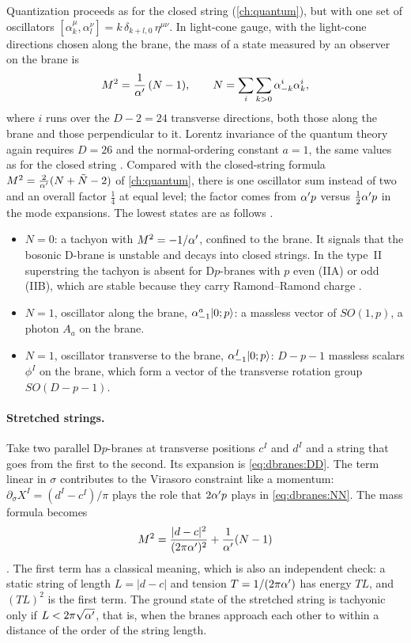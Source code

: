 Quantization proceeds as for the closed string (\cref{ch:quantum}), but with one set of
oscillators $[\alpha^\mu_k,\alpha^\nu_l]=k\,\delta_{k+l,0}\,\eta^{\mu\nu}$. In light-cone gauge, with the
light-cone directions chosen along the brane, the mass of a state measured by an observer on the
brane is
\begin{equation}\label{eq:dbranes:mass}
 M^2=\frac1{\alpha'}\,(N-1),\qquad N=\sum_{i}\sum_{k>0}\alpha^i_{-k}\alpha^i_k ,
\end{equation}
where $i$ runs over the $D-2=24$ transverse directions, both those along the brane and those
perpendicular to it. Lorentz invariance of the quantum theory again requires $D=26$ and the
normal-ordering constant $a=1$, the same values as for the closed string . Compared with the closed-string formula $M^2=\frac2{\alpha'}(N+\tilde N-2)$ of
\cref{ch:quantum}, there is one oscillator sum instead of two and an overall factor $\frac14$ at
equal level; the factor comes from $\alpha' p$ versus $\frac12\alpha' p$ in the mode expansions. The
lowest states are as follows .
\begin{itemize}[leftmargin=*]
\item $N=0$: a tachyon with $M^2=-1/\alpha'$, confined to the brane. It signals that the bosonic
 D-brane is unstable and decays into closed strings. In the type~II superstring the tachyon is
 absent for D$p$-branes with $p$ even (IIA) or odd (IIB), which are stable because they carry
 Ramond--Ramond charge .
\item $N=1$, oscillator along the brane, $\alpha^a_{-1}|0;p\rangle$: a massless vector of
 $SO(1,p)$, a photon $A_a$ on the brane.
\item $N=1$, oscillator transverse to the brane, $\alpha^I_{-1}|0;p\rangle$: $D-p-1$ massless
 scalars $\phi^I$ on the brane, which form a vector of the transverse rotation group
 $SO(D-p-1)$.
\end{itemize}

\paragraph{Stretched strings.}
Take two parallel D$p$-branes at transverse positions $c^I$ and $d^I$ and a string that goes
from the first to the second. Its expansion is \eqref{eq:dbranes:DD}. The term linear in
$\sigma$ contributes to the Virasoro constraint like a momentum: $\partial_\sigma X^I=(d^I-c^I)/\pi$
plays the role that $2\alpha' p$ plays in \eqref{eq:dbranes:NN}. The mass formula becomes
\begin{equation}\label{eq:dbranes:stretched}
 M^2=\frac{|d-c|^2}{(2\pi\alpha')^2}+\frac1{\alpha'}(N-1)
\end{equation}
. The first term has a classical meaning, which is also an
independent check: a static string of length $L=|d-c|$ and tension $T=1/(2\pi\alpha')$ has energy
$TL$, and $(TL)^2$ is the first term. The ground state of the stretched string is tachyonic only
if $L<2\pi\sqrt{\alpha'}$, that is, when the branes approach each other to within a distance of the
order of the string length.

